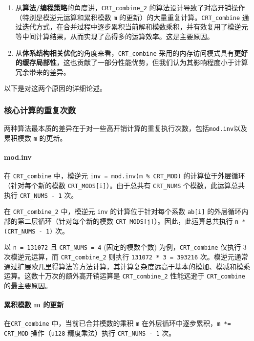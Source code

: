 \documentclass[a4paper]{article}
\begin{document}
\begin{enumerate}
\item 从\textbf{算法/编程策略}的角度讲，\texttt{CRT\_combine\_2} 的算法设计导致了对高开销操作（特别是模逆元运算和累积模数 \texttt{m} 的更新）的大量重复计算。\texttt{CRT\_combine} 通过迭代方式，在合并过程中逐步累积当前解和模数乘积，并有效复用了模逆元等中间计算结果，从而实现了高得多的运算效率。这是主要原因。
\item 从\textbf{体系结构相关优化}的角度来看，\texttt{CRT\_combine} 采用的内存访问模式具有\textbf{更好的缓存局部性}，这也贡献了一部分性能优势，但我们认为其影响程度小于计算冗余带来的差异。
\end{enumerate}

以下是对这两个原因的详细论述。

\subsubsection{核心计算的重复次数}

两种算法最本质的差异在于对一些高开销计算的重复执行次数，包括\texttt{mod.inv}以及累积模数 \texttt{m} 的更新。

\paragraph{mod.inv}

在 \texttt{CRT\_combine} 中，模逆元 \texttt{inv = mod.inv(m \% CRT\_MOD)} 的计算位于外层循环（针对每个新的模数 \texttt{CRT\_MODS[i]}）。由于总共有 \texttt{CRT\_NUMS} 个模数，此运算总共执行 \texttt{CRT\_NUMS - 1} 次。

在 \texttt{CRT\_combine\_2} 中，模逆元 \texttt{inv} 的计算位于针对每个系数 \texttt{ab[i]} 的外层循环内部的第二层循环（针对每个新的模数 \texttt{CRT\_MODS[j]}）。因此，此运算总共执行 \texttt{n * (CRT\_NUMS - 1)} 次。

以 \texttt{n = 131072} 且 \texttt{CRT\_NUMS = 4} (固定的模数个数) 为例，\texttt{CRT\_combine} 仅执行 3 次模逆元运算，而 \texttt{CRT\_combine\_2} 则执行 \texttt{131072 * 3 = 393216} 次。模逆元通常通过扩展欧几里得算法等方法计算，其计算复杂度远高于基本的模加、模减和模乘运算。这数十万次的额外高开销运算是 \texttt{CRT\_combine\_2} 性能远逊于 \texttt{CRT\_combine} 的最主要原因。

\paragraph{累积模数 m 的更新}

在\texttt{CRT\_combine} 中，当前已合并模数的乘积 \texttt{m} 在外层循环中逐步累积，\texttt{m *= CRT\_MOD} 操作（\texttt{u128} 精度乘法）执行 \texttt{CRT\_NUMS - 1} 次。
\end{document}
